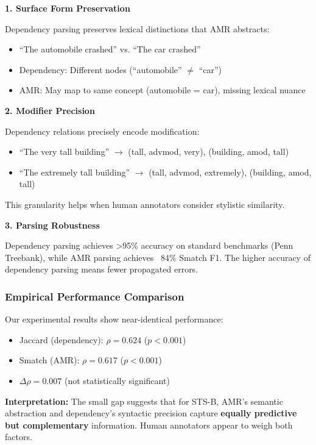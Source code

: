 \documentclass[11pt,a4paper]{article}
\begin{document}
\textbf{1. Surface Form Preservation}

Dependency parsing preserves lexical distinctions that AMR abstracts:
\begin{itemize}
    \item ``The automobile crashed'' vs. ``The car crashed''
    \item Dependency: Different nodes (``automobile'' $\neq$ ``car'')
    \item AMR: May map to same concept (automobile = car), missing lexical nuance
\end{itemize}

\textbf{2. Modifier Precision}

Dependency relations precisely encode modification:
\begin{itemize}
    \item ``The very tall building'' $\to$ (tall, advmod, very), (building, amod, tall)
    \item ``The extremely tall building'' $\to$ (tall, advmod, extremely), (building, amod, tall)
\end{itemize}

This granularity helps when human annotators consider stylistic similarity.

\textbf{3. Parsing Robustness}

Dependency parsing achieves >95\% accuracy on standard benchmarks (Penn Treebank), while AMR parsing achieves ~84\% Smatch F1. The higher accuracy of dependency parsing means fewer propagated errors.

\subsubsection{Empirical Performance Comparison}

Our experimental results show near-identical performance:
\begin{itemize}
    \item Jaccard (dependency): $\rho = 0.624$ ($p < 0.001$)
    \item Smatch (AMR): $\rho = 0.617$ ($p < 0.001$)
    \item $\Delta\rho = 0.007$ (not statistically significant)
\end{itemize}

\textbf{Interpretation:} The small gap suggests that for STS-B, AMR's semantic abstraction and dependency's syntactic precision capture \textbf{equally predictive but complementary} information. Human annotators appear to weigh both factors.
\end{document}
